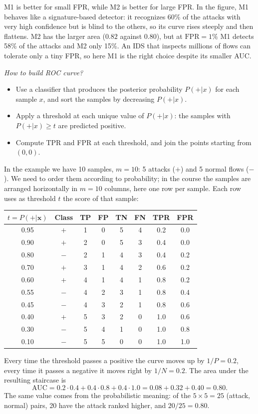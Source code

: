 M1 is better for small FPR, while M2 is better for large FPR. In the figure, M1 behaves like a signature-based detector: it recognizes 60\% of the attacks with very high confidence but is blind to the others, so its curve rises steeply and then flattens. M2 has the larger area ($0.82$ against $0.80$), but at $\text{FPR} = 1\%$ M1 detects 58\% of the attacks and M2 only 15\%. An IDS that inspects millions of flows can tolerate only a tiny FPR, so here M1 is the right choice despite its smaller AUC.

\textit{How to build ROC curve?}
\begin{itemize}
    \item Use a classifier that produces the posterior probability $P(+|x)$ for each sample $x$, and sort the samples by decreasing $P(+|x)$.
    \item Apply a threshold at each unique value of $P(+|x)$: the samples with $P(+|x) \geq t$ are predicted positive.
    \item Compute TPR and FPR at each threshold, and join the points starting from $(0,0)$.
\end{itemize}

In the example we have 10 samples, $m = 10$: 5 attacks ($+$) and 5 normal flows ($-$). We need to order them according to probability; in the course the samples are arranged horizontally in $m = 10$ columns, here one row per sample. Each row uses as threshold $t$ the score of that sample:
\begin{center}
    \begin{tabular}{c|c|c|c|c|c|c|c}
        \textbf{$t = P(+|\mathbf{x})$} & \textbf{Class} & \textbf{TP} & \textbf{FP} & \textbf{TN} & \textbf{FN} & \textbf{TPR} & \textbf{FPR} \\ \hline
        0.95 & $+$ & 1 & 0 & 5 & 4 & 0.2 & 0.0 \\
        0.90 & $+$ & 2 & 0 & 5 & 3 & 0.4 & 0.0 \\
        0.80 & $-$ & 2 & 1 & 4 & 3 & 0.4 & 0.2 \\
        0.70 & $+$ & 3 & 1 & 4 & 2 & 0.6 & 0.2 \\
        0.60 & $+$ & 4 & 1 & 4 & 1 & 0.8 & 0.2 \\
        0.55 & $-$ & 4 & 2 & 3 & 1 & 0.8 & 0.4 \\
        0.45 & $-$ & 4 & 3 & 2 & 1 & 0.8 & 0.6 \\
        0.40 & $+$ & 5 & 3 & 2 & 0 & 1.0 & 0.6 \\
        0.30 & $-$ & 5 & 4 & 1 & 0 & 1.0 & 0.8 \\
        0.10 & $-$ & 5 & 5 & 0 & 0 & 1.0 & 1.0 \\
    \end{tabular}
\end{center}
Every time the threshold passes a positive the curve moves up by $1/P = 0.2$, every time it passes a negative it moves right by $1/N = 0.2$. The area under the resulting staircase is
\[
\text{AUC} = 0.2 \cdot 0.4 + 0.4 \cdot 0.8 + 0.4 \cdot 1.0 = 0.08 + 0.32 + 0.40 = 0.80 .
\]
The same value comes from the probabilistic meaning: of the $5 \times 5 = 25$ (attack, normal) pairs, 20 have the attack ranked higher, and $20/25 = 0.80$.

